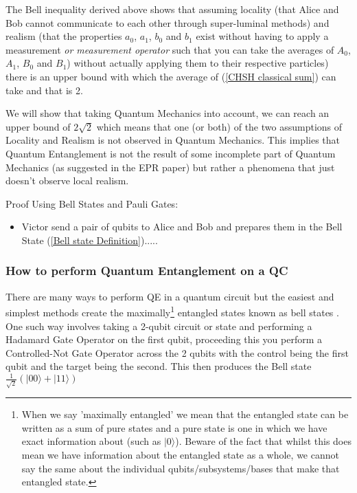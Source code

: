 The Bell inequality derived above shows that assuming locality (that Alice and Bob cannot communicate to each other through super-luminal methods) and realism (that the properties $a_{0}$, $a_{1}$, $b_{0}$ and $b_{1}$ exist without having to apply a measurement \textit{or measurement operator} such that you can take the averages of $A_{0}$, $A_{1}$, $B_{0}$ and $B_{1}$) without actually applying them to their respective particles) there is an upper bound with which the average of (\ref{CHSH classical sum}) can take and that is 2.

\vspace{1em}

We will show that taking Quantum Mechanics into account, we can reach an upper bound of $2\sqrt{2}$ which means that one (or both) of the two assumptions of Locality and Realism is not observed in Quantum Mechanics. This implies that Quantum Entanglement is not the result of some incomplete part of Quantum Mechanics (as suggested in the EPR paper) but rather a phenomena that just doesn't observe local realism.

Proof Using Bell States and Pauli Gates:
\begin{itemize}
    \item Victor send a pair of qubits to Alice and Bob and prepares them in the Bell State (\ref{Bell state Definition}).....
\end{itemize}

\subsubsection{How to perform Quantum Entanglement on a QC}
There are many ways to perform QE in a quantum circuit but the easiest and simplest methods create the maximally\footnote{When we say 'maximally entangled' we mean that the entangled state can be written as a sum of pure states and a pure state is one in which we have exact information about (such as $|0\rangle$). Beware of the fact that whilst this does mean we have information about the entangled state as a whole, we cannot say the same about the individual qubits/subsystems/bases that make that entangled state.} entangled states known as bell states \label{Bell state Definition}. One such way involves taking a 2-qubit circuit or state and performing a Hadamard Gate Operator on the first qubit, proceeding this you perform a Controlled-Not Gate Operator across the 2 qubits with the control being the first qubit and the target being the second. This then produces the Bell state $\frac{1}{\sqrt{2}}(|00\rangle + |11\rangle)$

